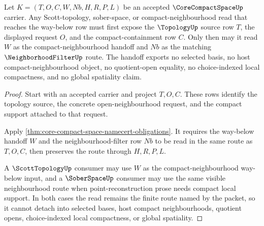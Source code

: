 \begin{theorem}
\label{thm:core-compact-space-way-below-neighborhood-handoff}
Let $K=(T,O,C,W,Nb,H,R,P,L)$ be an accepted $\CoreCompactSpaceUp$ carrier. Any Scott-topology, sober-space, or compact-neighbourhood read that reaches the way-below row must first expose the $\TopologyUp$ source row $T$, the displayed request $O$, and the compact-containment row $C$. Only then may it read $W$ as the compact-neighbourhood handoff and $Nb$ as the matching $\NeighborhoodFilterUp$ route. The handoff exports no selected basis, no host compact-neighbourhood object, no quotient-open equality, no choice-indexed local compactness, and no global spatiality claim.
\end{theorem}
\begin{proof}
Start with an accepted carrier and project $T,O,C$. These rows identify the topology source, the concrete open-neighbourhood request, and the compact support attached to that request.

Apply \autoref{thm:core-compact-space-namecert-obligations}. It requires the way-below handoff $W$ and the neighbourhood-filter row $Nb$ to be read in the same route as $T,O,C$, then preserves the route through $H,R,P,L$.

A $\ScottTopologyUp$ consumer may use $W$ as the compact-neighbourhood way-below input, and a $\SoberSpaceUp$ consumer may use the same visible neighbourhood route when point-reconstruction prose needs compact local support. In both cases the read remains the finite route named by the packet, so it cannot detach into selected bases, host compact neighbourhoods, quotient opens, choice-indexed local compactness, or global spatiality.
\end{proof}


